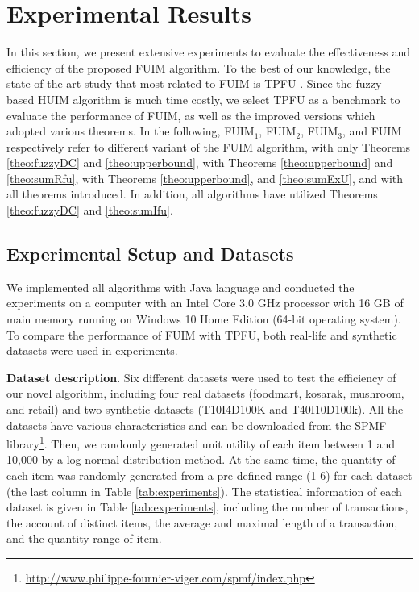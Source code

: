 \documentclass[journal]{IEEEtran}
\begin{document}



\section{Experimental Results}
\label{sec:experimental}

In this section, we present extensive experiments to evaluate the effectiveness and efficiency of the proposed FUIM algorithm. To the best of our knowledge, the state-of-the-art study that most related to FUIM is TPFU \cite{lan2015fuzzy}. Since the fuzzy-based HUIM algorithm is much time costly, we select TPFU as a benchmark to evaluate the performance of FUIM, as well as the improved versions which adopted various theorems. In the following, FUIM$_1$, FUIM$_2$, FUIM$_3$, and FUIM respectively refer to different variant of the FUIM algorithm, with only Theorems \ref{theo:fuzzyDC} and \ref{theo:upperbound}, with Theorems \ref{theo:upperbound} and \ref{theo:sumRfu}, with Theorems \ref{theo:upperbound}, and \ref{theo:sumExU}, and with all theorems introduced. In addition, all algorithms have utilized Theorems \ref{theo:fuzzyDC} and \ref{theo:sumIfu}.


\subsection{Experimental Setup and Datasets}

We implemented all algorithms with Java language and conducted the experiments on a computer with an Intel Core 3.0 GHz processor with 16 GB of main memory running on Windows 10 Home Edition (64-bit operating system). To compare the performance of FUIM with TPFU, both real-life and synthetic datasets were used in experiments.

\textbf{Dataset description}. Six different datasets were used to test the efficiency of our novel algorithm, including four real datasets (foodmart, kosarak, mushroom, and retail) and two synthetic datasets (T10I4D100K and T40I10D100k). All the datasets have various characteristics and can be downloaded from the SPMF library\footnote{\url{http://www.philippe-fournier-viger.com/spmf/index.php}}. Then, we randomly generated unit utility of each item between 1 and 10,000 by a log-normal distribution method. At the same time, the quantity of each item was randomly generated from a pre-defined range (1-6) for each dataset (the last column in Table \ref{tab:experiments}). The statistical information of each dataset is given in Table \ref{tab:experiments}, including the number of transactions, the account of distinct items, the average and maximal length of a transaction, and the quantity range of item.
\end{document}
